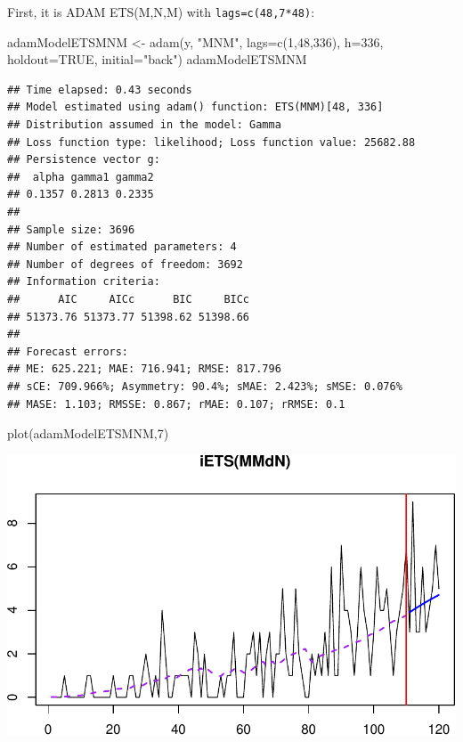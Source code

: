 \documentclass[
]{book}
\newenvironment{Shaded}{\begin{snugshade}}{\end{snugshade}}
\newcommand{\AttributeTok}[1]{\textcolor[rgb]{0.77,0.63,0.00}{#1}}
\newcommand{\ConstantTok}[1]{\textcolor[rgb]{0.00,0.00,0.00}{#1}}
\newcommand{\DecValTok}[1]{\textcolor[rgb]{0.00,0.00,0.81}{#1}}
\newcommand{\FunctionTok}[1]{\textcolor[rgb]{0.00,0.00,0.00}{#1}}
\newcommand{\NormalTok}[1]{#1}
\newcommand{\OtherTok}[1]{\textcolor[rgb]{0.56,0.35,0.01}{#1}}
\newcommand{\StringTok}[1]{\textcolor[rgb]{0.31,0.60,0.02}{#1}}
\theoremstyle{definition}
\theoremstyle{definition}
\theoremstyle{definition}
\theoremstyle{definition}
\theoremstyle{remark}
\begin{document}
First, it is ADAM ETS(M,N,M) with \texttt{lags=c(48,7*48)}:

\begin{Shaded}
\begin{Highlighting}[]
\NormalTok{adamModelETSMNM }\OtherTok{\textless{}{-}} \FunctionTok{adam}\NormalTok{(y, }\StringTok{"MNM"}\NormalTok{, }\AttributeTok{lags=}\FunctionTok{c}\NormalTok{(}\DecValTok{1}\NormalTok{,}\DecValTok{48}\NormalTok{,}\DecValTok{336}\NormalTok{),}
                        \AttributeTok{h=}\DecValTok{336}\NormalTok{, }\AttributeTok{holdout=}\ConstantTok{TRUE}\NormalTok{,}
                        \AttributeTok{initial=}\StringTok{"back"}\NormalTok{)}
\NormalTok{adamModelETSMNM}
\end{Highlighting}
\end{Shaded}

\begin{verbatim}
## Time elapsed: 0.43 seconds
## Model estimated using adam() function: ETS(MNM)[48, 336]
## Distribution assumed in the model: Gamma
## Loss function type: likelihood; Loss function value: 25682.88
## Persistence vector g:
##  alpha gamma1 gamma2 
## 0.1357 0.2813 0.2335 
## 
## Sample size: 3696
## Number of estimated parameters: 4
## Number of degrees of freedom: 3692
## Information criteria:
##      AIC     AICc      BIC     BICc 
## 51373.76 51373.77 51398.62 51398.66 
## 
## Forecast errors:
## ME: 625.221; MAE: 716.941; RMSE: 817.796
## sCE: 709.966%; Asymmetry: 90.4%; sMAE: 2.423%; sMSE: 0.076%
## MASE: 1.103; RMSSE: 0.867; rMAE: 0.107; rRMSE: 0.1
\end{verbatim}

\begin{Shaded}
\begin{Highlighting}[]
\FunctionTok{plot}\NormalTok{(adamModelETSMNM,}\DecValTok{7}\NormalTok{)}
\end{Highlighting}
\end{Shaded}

\includegraphics{adam_files/figure-latex/unnamed-chunk-98-1.pdf}
\end{document}
